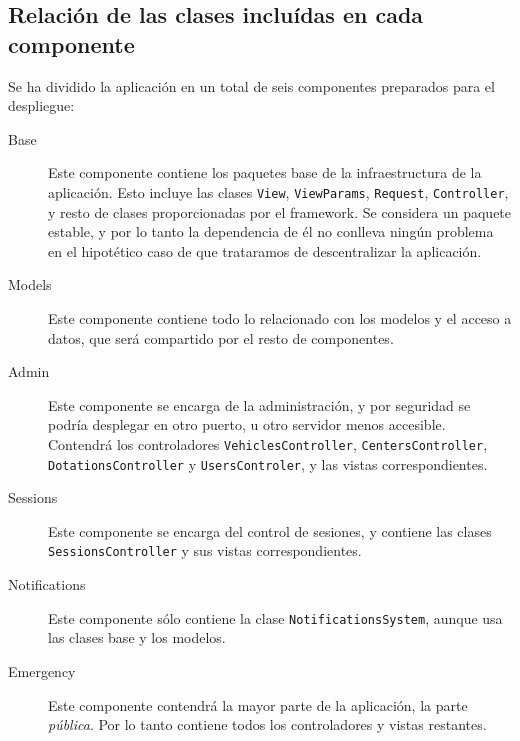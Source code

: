\subsection{Relación de las clases incluídas en cada componente}

Se ha dividido la aplicación en un total de seis componentes preparados para
el despliegue:

\begin{description}
  \item[Base] Este componente contiene los paquetes base de la infraestructura
    de la aplicación. Esto incluye las clases \texttt{View},
    \texttt{ViewParams}, \texttt{Request}, \texttt{Controller}, y resto de
    clases proporcionadas por el framework. Se considera un paquete estable, y
    por lo tanto la dependencia de él no conlleva ningún problema en el
    hipotético caso de que trataramos de descentralizar la aplicación.
  \item[Models] Este componente contiene todo lo relacionado con los modelos y
    el acceso a datos, que será compartido por el resto de componentes.
  \item[Admin] Este componente se encarga de la administración, y por seguridad
    se podría desplegar en otro puerto, u otro servidor menos accesible.
    Contendrá los controladores \texttt{VehiclesController},
    \texttt{CentersController}, \texttt{DotationsController} y
    \texttt{UsersControler}, y las vistas correspondientes.
  \item[Sessions] Este componente se encarga del control de sesiones, y contiene
    las clases \texttt{SessionsController} y sus vistas correspondientes.
  \item[Notifications] Este componente sólo contiene la clase
    \texttt{NotificationsSystem}, aunque usa las clases base y los modelos.
  \item[Emergency] Este componente contendrá la mayor parte de la aplicación,
    la parte \textit{pública}. Por lo tanto contiene todos los controladores y
    vistas restantes.
\end{description}
